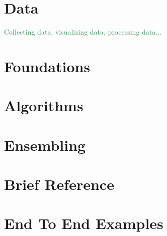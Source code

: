 \documentclass[12pt]{book}
\def\r#1{\textcolor{SeaGreen}{#1}}
\begin{document}



\part{Data}
\r{Collecting data, visualizing data, processing data...}



\part{Foundations}





\part{Algorithms}


\part{Ensembling}






\part{Brief Reference}







\part{End To End Examples}
\end{document}
